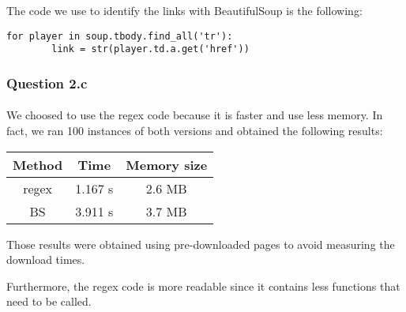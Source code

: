 The code we use to identify the links with BeautifulSoup is the following:
\begin{verbatim}
for player in soup.tbody.find_all('tr'):
        link = str(player.td.a.get('href'))
\end{verbatim}

\subsubsection{Question 2.c}
\label{subsubsec:312c}
\paragraph{} We choosed to use the regex code because it is faster and use less memory. In fact, we ran 100 instances of both versions and obtained the following results:
\begin{center}
	\begin{tabular}{| c | c | c |}
	\hline
	Method & Time & Memory size \\ \hline
	regex 	& 1.167 s & 2.6 MB \\ \hline
	BS & 3.911 s & 3.7 MB \\
	\hline
	\end{tabular}
\end{center}

Those results were obtained using pre-downloaded pages to avoid measuring the download times.

Furthermore, the regex code is more readable since it contains less functions that need to be called.
